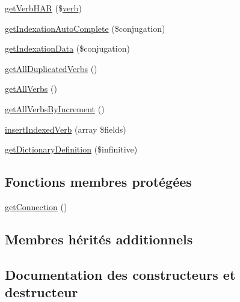 \begin{DoxyCompactItemize}
\item 
\hyperlink{class_conjugation_data_provider_bootstrap_a97d65e8654cbcbb6910814dc9de5a6a8}{get\+Verb\+H\+AR} (\$\hyperlink{teibase_8php_aa8d8fadfcf4239c7aa288414da9d0ace}{verb})
\item 
\hyperlink{class_conjugation_data_provider_bootstrap_a5a98878c2e74fe7d3e9c53bff4250922}{get\+Indexation\+Auto\+Complete} (\$conjugation)
\item 
\hyperlink{class_conjugation_data_provider_bootstrap_a2e41e1de20ebc690c39f91fb05442450}{get\+Indexation\+Data} (\$conjugation)
\item 
\hyperlink{class_conjugation_data_provider_bootstrap_a0660df129657acbc695a05d6c27b4937}{get\+All\+Duplicated\+Verbs} ()
\item 
\hyperlink{class_conjugation_data_provider_bootstrap_a1fe64dbe28c3ed2c1c77797cb03703d8}{get\+All\+Verbs} ()
\item 
\hyperlink{class_conjugation_data_provider_bootstrap_a94516c8da8d3dd9ddbfc49ca05b355e3}{get\+All\+Verbs\+By\+Increment} ()
\item 
\hyperlink{class_conjugation_data_provider_bootstrap_a862ea39b6d38e79b84cfeaccba0fbd52}{insert\+Indexed\+Verb} (array \$fields)
\item 
\hyperlink{class_conjugation_data_provider_bootstrap_a6e00cefec5c7a7821f039a263ddbe21a}{get\+Dictionary\+Definition} (\$infinitive)
\end{DoxyCompactItemize}
\subsection*{Fonctions membres protégées}
\begin{DoxyCompactItemize}
\item 
\hyperlink{class_conjugation_data_provider_bootstrap_a253604839693a34eb29b54e9356e40ab}{get\+Connection} ()
\end{DoxyCompactItemize}
\subsection*{Membres hérités additionnels}


\subsection{Documentation des constructeurs et destructeur}
\hypertarget{class_conjugation_data_provider_bootstrap_acd6426b902009eb030bafe202f23926c}{}\label{class_conjugation_data_provider_bootstrap_acd6426b902009eb030bafe202f23926c} 
